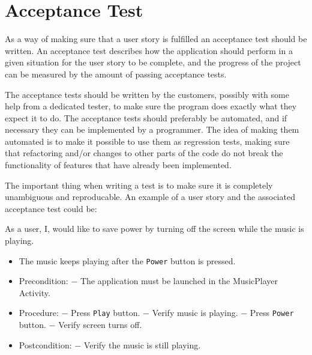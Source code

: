 \section{Acceptance Test}
As a way of making sure that a user story is fulfilled an acceptance test should be written. An acceptance test describes how the application should perform in a given situation for the user story to be complete, and the progress of the project can be measured by the amount of passing acceptance tests.

The acceptance tests should be written by the customers, possibly with some help from a dedicated tester, to make sure the program does exactly what they expect it to do. The acceptance tests should preferably be automated, and if necessary they can be implemented by a programmer. The idea of making them automated is to make it possible to use them as regression tests, making sure that refactoring and/or changes to other parts of the code do not break the functionality of features that have already been implemented.

The important thing when writing a test is to make sure it is completely unambiguous and reproducable. An example of a user story and the associated acceptance test could be:

{As a user, I, would like to save power by turning off the screen while the music is playing.}
{\begin{itemize}
\item The music keeps playing after the \texttt{Power} button is pressed.
\end{itemize}}
{\begin{itemize}
\item Precondition: 
\subitem $-$ The application must be launched in the MusicPlayer Activity.

\item Procedure:
\subitem $-$ Press \texttt{Play} button.
\subitem $-$ Verify music is playing.
\subitem $-$ Press \texttt{Power} button.
\subitem $-$ Verify screen turns off.

\item Postcondition:
\subitem $-$ Verify the music is still playing.
\end{itemize}}





